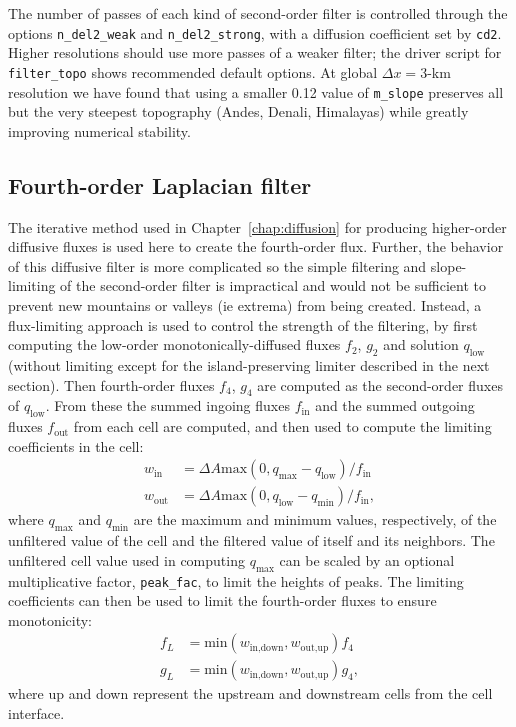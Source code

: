 \documentclass[10pt,letterpaper,margin=1in]{memoir}
\begin{document}
The number of passes of each kind of second-order filter is controlled through the options \texttt{{n_del2_weak}} and \texttt{{n_del2_strong}}, with a diffusion coefficient set by \texttt{cd2}. Higher resolutions should use more passes of a weaker filter; the driver script for \texttt{{filter_topo}} shows recommended default options. At global $\Delta x = 3$-km resolution we have found that using a smaller 0.12 value of \texttt{{m_slope}} preserves all but the very steepest topography (Andes, Denali, Himalayas) while greatly improving numerical stability.

\subsection{Fourth-order Laplacian filter}

The iterative method used in Chapter~\ref{chap:diffusion} for producing higher-order diffusive fluxes is used here to create the fourth-order flux. Further, the behavior of this diffusive filter is more complicated so the simple filtering and slope-limiting of the second-order filter is impractical and would not be sufficient to prevent new mountains or valleys (ie extrema) from being created. Instead, a flux-limiting approach is used to control the strength of the filtering, by first computing the low-order monotonically-diffused fluxes $f_2$, $g_2$ and solution $q_\text{low}$ (without limiting except for the island-preserving limiter described in the next section). Then fourth-order fluxes $f_4$, $g_4$ are computed as the second-order fluxes of $q_\text{low}$. From these the summed ingoing fluxes $f_\text{in}$ and the summed outgoing fluxes $f_\text{out}$ from each cell are computed, and then used to compute the limiting coefficients in the cell:
\begin{align}
w_\text{in} &= \Delta A \text{max} \left (0, q_{\text{max}} - q_\text{low} \right ) / f_\text{in} \\
w_\text{out} &= \Delta A \text{max} \left (0, q_\text{low} - q_{\text{min}} \right ) / f_\text{in},
\end{align}
where $q_{\text{max}}$ and $q_{\text{min}}$ are the maximum and minimum values, respectively, of the unfiltered value of the cell and the filtered value of itself and its neighbors. The unfiltered cell value used in computing $q_\text{max}$ can be scaled by an optional multiplicative factor, \texttt{peak_fac}, to limit the heights of peaks. The limiting coefficients can then be used to limit the fourth-order fluxes to ensure monotonicity:
\begin{align}
f_L &= \text{min} \left ( w_\text{in,down}, w_\text{out,up} \right ) f_4 \\
g_L &= \text{min} \left ( w_\text{in,down}, w_\text{out,up} \right ) g_4,
\end{align}
where up and down represent the upstream and downstream cells from the cell interface.
\end{document}

